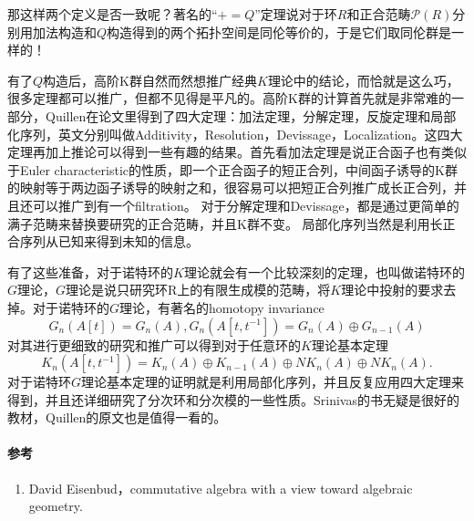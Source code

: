 那这样两个定义是否一致呢？著名的“$+ = Q$”定理说对于环$R$和正合范畴$\mathcal{P}(R)$分别用加法构造和$Q$构造得到的两个拓扑空间是同伦等价的，于是它们取同伦群是一样的！

有了$Q$构造后，高阶K群自然而然想推广经典$K$理论中的结论，而恰就是这么巧，很多定理都可以推广，但都不见得是平凡的。高阶K群的计算首先就是非常难的一部分，Quillen在论文里得到了四大定理：加法定理，分解定理，反旋定理和局部化序列，英文分别叫做Additivity，Resolution，Devissage，Localization。这四大定理再加上推论可以得到一些有趣的结果。首先看加法定理是说正合函子也有类似于Euler characteristic的性质，即一个正合函子的短正合列，中间函子诱导的K群的映射等于两边函子诱导的映射之和，很容易可以把短正合列推广成长正合列，并且还可以推广到有一个filtration。
对于分解定理和Devissage，都是通过更简单的满子范畴来替换要研究的正合范畴，并且K群不变。
局部化序列当然是利用长正合序列从已知来得到未知的信息。

有了这些准备，对于诺特环的$K$理论就会有一个比较深刻的定理，也叫做诺特环的$G$理论，$G$理论是说只研究环R上的有限生成模的范畴，将$K$理论中投射的要求去掉。对于诺特环的$G$理论，有著名的homotopy invariance \[G_n(A[t])=G_n(A),G_n(A[t,t^{-1}])=G_n(A)\oplus G_{n-1}(A)\]
对其进行更细致的研究和推广可以得到对于任意环的$K$理论基本定理
\[K_n(A[t,t^{-1}])=K_n(A)\oplus K_{n-1}(A) \oplus NK_n(A) \oplus NK_n(A).\]
对于诺特环$G$理论基本定理的证明就是利用局部化序列，并且反复应用四大定理来得到，并且还详细研究了分次环和分次模的一些性质。Srinivas的书无疑是很好的教材，Quillen的原文也是值得一看的。

\paragraph{参考}
\begin{enumerate}
  \item David Eisenbud，commutative algebra with a view toward algebraic geometry.
 
\end{enumerate}

% 
